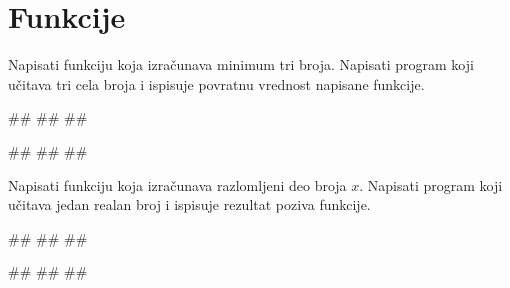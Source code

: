 \section{Funkcije}

\begin{Exercise}[label=FUN_01] 
Napisati funkciju  koja izračunava
minimum tri broja. Napisati program koji učitava tri cela broja i
ispisuje povratnu vrednost napisane funkcije.

\begin{miditest}
\begin{upotreba}{1}
#\naslovInt#
##
##
\end{upotreba}
\end{miditest}
\begin{miditest}
\begin{upotreba}{2}
#\naslovInt#
##
##
\end{upotreba}
\end{miditest}
\end{Exercise}
\ifresenja 
\begin{Answer}[ref=FUN_01]
\end{Answer} 
\fi

\begin{Exercise}[label=FUN_02] 
Napisati funkciju  koja
izračunava razlomljeni deo broja $x$. Napisati program koji učitava
jedan realan broj i ispisuje rezultat poziva funkcije.
 
\begin{miditest}
\begin{upotreba}{1}
#\naslovInt#
##
##
\end{upotreba}
\end{miditest}
\begin{miditest}
\begin{upotreba}{2}
#\naslovInt#
##
##
\end{upotreba}
\end{miditest}
\end{Exercise}
\ifresenja 
\begin{Answer}[ref=FUN_02]
\end{Answer} 
\fi

